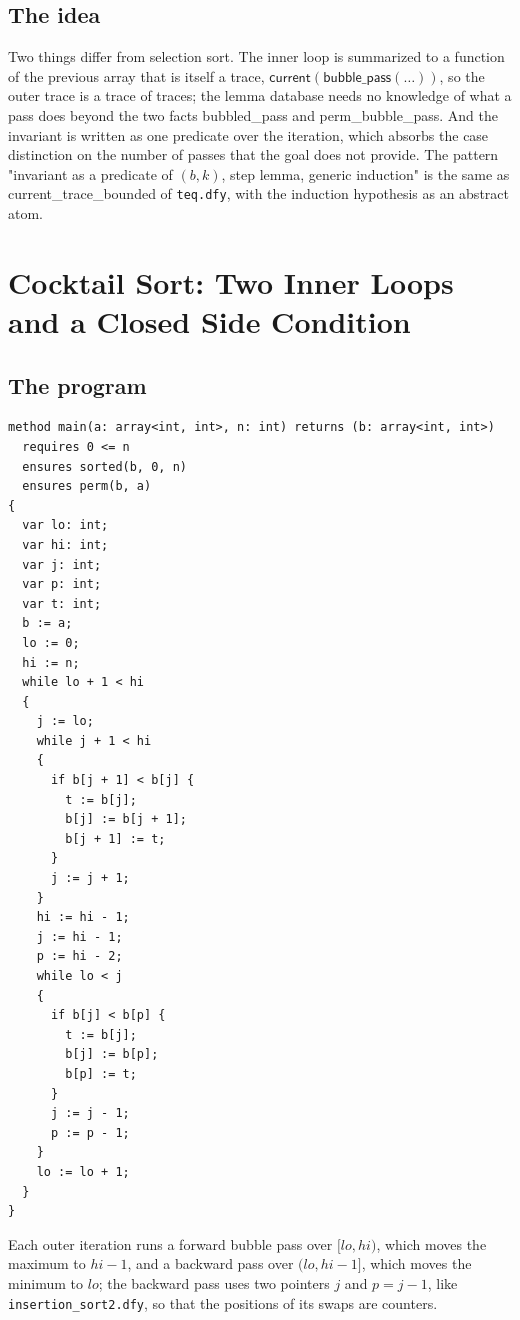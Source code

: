\documentclass[11pt,a4paper]{article}
\newcommand{\cur}{\mathsf{current}}
\newcommand{\lemma}[1]{\textsf{#1}}
\begin{document}
\subsection{The idea}
Two things differ from selection sort. The inner loop is summarized to a function of the previous
array that is itself a trace, $\cur(\mathsf{bubble\_pass}(\ldots))$, so the outer trace is a trace of
traces; the lemma database needs no knowledge of what a pass does beyond the two facts
\lemma{bubbled\_pass} and \lemma{perm\_bubble\_pass}. And the invariant is written as one predicate over
the iteration, which absorbs the case distinction on the number of passes that the goal does not provide.
The pattern "invariant as a predicate of $(b, k)$, step lemma, generic induction" is the same as
\lemma{current\_trace\_bounded} of \texttt{teq.dfy}, with the induction hypothesis as an abstract atom.

\section{Cocktail Sort: Two Inner Loops and a Closed Side Condition}\label{sec:cock}

\subsection{The program}
\begin{lstlisting}
method main(a: array<int, int>, n: int) returns (b: array<int, int>)
  requires 0 <= n
  ensures sorted(b, 0, n)
  ensures perm(b, a)
{
  var lo: int;
  var hi: int;
  var j: int;
  var p: int;
  var t: int;
  b := a;
  lo := 0;
  hi := n;
  while lo + 1 < hi
  {
    j := lo;
    while j + 1 < hi
    {
      if b[j + 1] < b[j] {
        t := b[j];
        b[j] := b[j + 1];
        b[j + 1] := t;
      }
      j := j + 1;
    }
    hi := hi - 1;
    j := hi - 1;
    p := hi - 2;
    while lo < j
    {
      if b[j] < b[p] {
        t := b[j];
        b[j] := b[p];
        b[p] := t;
      }
      j := j - 1;
      p := p - 1;
    }
    lo := lo + 1;
  }
}
\end{lstlisting}
Each outer iteration runs a forward bubble pass over $[lo, hi)$, which moves the maximum to $hi - 1$, and a
backward pass over $(lo, hi - 1]$, which moves the minimum to $lo$; the backward pass uses two pointers
$j$ and $p = j - 1$, like \texttt{insertion\_sort2.dfy}, so that the positions of its swaps are counters.
\end{document}

